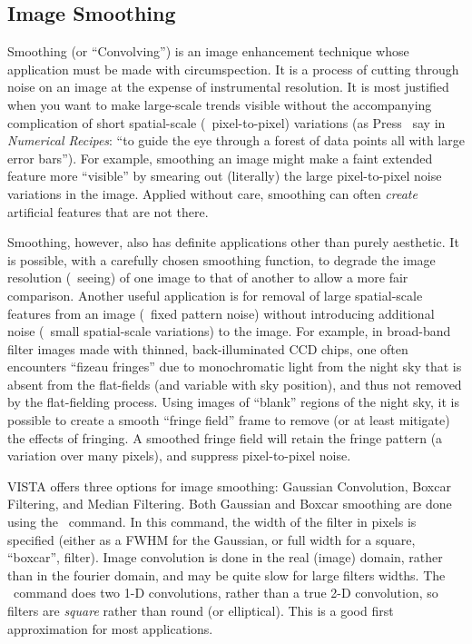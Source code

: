 \subsection{Image Smoothing}
\label{sec:imsmooth}
Smoothing (or ``Convolving'') is an image enhancement technique whose
application must be made with circumspection.  It is a process of cutting
through noise on an image at the expense of instrumental resolution.  It is
most justified when you want to make large-scale trends visible without the
accompanying complication of short spatial-scale (\ie\ pixel-to-pixel)
variations (as Press \etal\ say in {\it Numerical Recipes}: ``to guide the eye
through a forest of data points all with large error bars'').   For example,
smoothing an image might make a faint extended feature more ``visible'' by
smearing out (literally) the large pixel-to-pixel noise variations in the
image. Applied without care, smoothing can often {\it create} artificial
features that are not there. 

Smoothing, however, also has definite applications other than purely
aesthetic.  It is possible, with a carefully chosen smoothing function, to
degrade the image resolution (\ie\ seeing) of one image to that of another to
allow a more fair comparison.   Another useful application is for removal of
large spatial-scale features from an image (\eg\ fixed pattern noise) without
introducing additional noise (\ie\ small spatial-scale variations) to the
image. For example, in broad-band filter images made with thinned,
back-illuminated CCD chips, one often encounters ``fizeau fringes'' due to
monochromatic light from the night sky that is absent from the flat-fields
(and variable with sky position), and thus not removed by the flat-fielding
process.  Using images of ``blank'' regions of the night sky, it is possible
to create a smooth ``fringe field'' frame to remove (or at least mitigate) the
effects of fringing.  A smoothed fringe field will retain the fringe pattern
(a variation over many pixels), and suppress pixel-to-pixel noise. 

VISTA offers three options for image smoothing:  Gaussian Convolution, Boxcar
Filtering, and Median Filtering.  Both Gaussian and Boxcar smoothing are done
using the \ command.  In this command, the width of the filter in
pixels is specified (either as a FWHM for the Gaussian, or full width for a
square, ``boxcar'', filter).  Image convolution is done in the real (image)
domain, rather than in the fourier domain, and may be quite slow for large
filters widths.  The \ command does two 1-D convolutions, rather
than a true 2-D convolution, so filters are {\it square} rather than round (or
elliptical). This is a good first approximation for most applications. 

